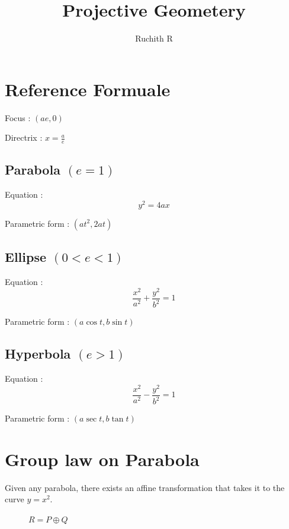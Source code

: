 \documentclass{report}
\begin{document}
\title{Projective Geometery}
\author{Ruchith R}
\date{}

\section*{Reference Formuale}
Focus : $(ae,0)$

\noindent
Directrix : $x = \frac{a}{e}$
\subsection*{Parabola $(e = 1)$}

Equation : $$y^2 = 4ax$$

\noindent
Parametric form : $(at^2,2at)$

\subsection*{Ellipse $(0 < e < 1)$}
Equation : $$\frac{x^2}{a^2} + \frac{y^2}{b^2} = 1$$

\noindent
Parametric form : $(a\cos t,b\sin t)$

\subsection*{Hyperbola $(e > 1)$}
Equation : $$\frac{x^2}{a^2} - \frac{y^2}{b^2} = 1$$

\noindent
Parametric form : $(a\sec t,b\tan t)$

\section*{Group law on Parabola}

Given any parabola, there exists an affine transformation that takes it to the curve $y = x^2$.
\begin{figure}[H]
    \centering
    \caption{$R = P\oplus Q$}
\end{figure}
\end{document}

